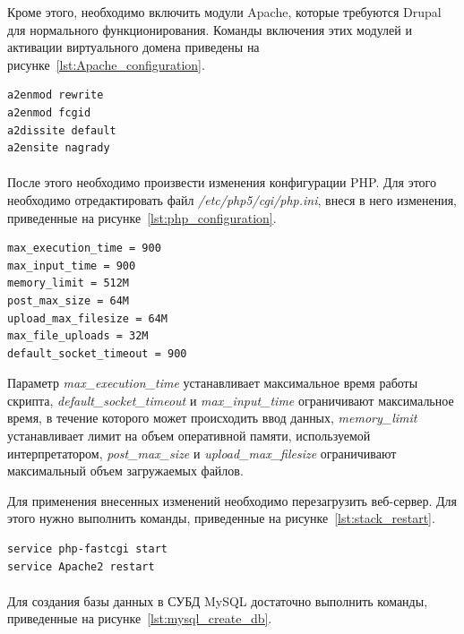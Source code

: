 Кроме этого, необходимо включить модули Apache, которые требуются Drupal для 
нормального функционирования. Команды включения этих модулей и активации 
виртуального домена приведены на рисунке~\ref{lst:Apache_configuration}.

\begin{lstlisting}[language=bash,
  caption=Команды включения дополнительных модулей
  Apache и активации виртуального домена,
  label=lst:Apache_configuration]
a2enmod rewrite
a2enmod fcgid
a2dissite default
a2ensite nagrady
\end{lstlisting}

\paragraph{}
После этого необходимо произвести изменения конфигурации PHP.
Для этого необходимо отредактировать файл \textit{/etc/php5/cgi/php.ini},
внеся в него изменения, приведенные на рисунке~\ref{lst:php_configuration}.

\begin{lstlisting}[language=bash,
  caption=Измененные параметры файла php.ini,
  label=lst:php_configuration]
max_execution_time = 900
max_input_time = 900
memory_limit = 512M
post_max_size = 64M
upload_max_filesize = 64M
max_file_uploads = 32M
default_socket_timeout = 900
\end{lstlisting}

Параметр \textit{max\_execution\_time} устанавливает максимальное 
время работы скрипта,
\textit{default\_socket\_timeout} и \textit{max\_input\_time} ограничивают
максимальное время, в течение которого может происходить ввод данных,  
\textit{memory\_limit} устанавливает лимит на объем оперативной памяти,
используемой интерпретатором,
\textit{post\_max\_size} и \textit{upload\_max\_filesize} ограничивают
максимальный объем загружаемых файлов.

Для применения внесенных изменений необходимо перезагрузить веб-сервер. 
Для этого нужно выполнить команды, приведенные на рисунке~\ref{lst:stack_restart}. 

\begin{lstlisting}[language=bash,
  caption=Команды перезагрузки веб-сервера,
  label=lst:stack_restart]
service php-fastcgi start
service Apache2 restart
\end{lstlisting}

\paragraph{}
Для создания базы данных в СУБД MySQL достаточно выполнить команды,
приведенные на рисунке~\ref{lst:mysql_create_db}.

